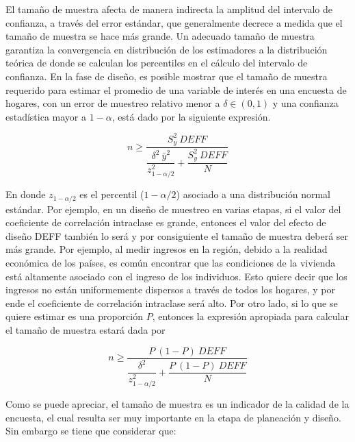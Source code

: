 \documentclass[
  12pt,
]{book}
\begin{document}
El tamaño de muestra afecta de manera indirecta la amplitud del intervalo de confianza, a través del error estándar, que generalmente decrece a medida que el tamaño de muestra se hace más grande. Un adecuado tamaño de muestra garantiza la convergencia en distribución de los estimadores a la distribución teórica de donde se calculan los percentiles en el cálculo del intervalo de confianza. En la fase de diseño, es posible mostrar que el tamaño de muestra requerido para estimar el promedio de una variable de interés en una encuesta de hogares, con un error de muestreo relativo menor a \(\delta \in (0,1)\) y una confianza estadística mayor a \(1-\alpha\), está dado por la siguiente expresión.

\[ 
n \geq \dfrac{S^2_{y}\ DEFF}{\dfrac{\delta^2 \  \bar{y}^2}{z_{1-\alpha/2}^2}+\dfrac{S^2_{y}\ DEFF}{N}}
\]

En donde \(z_{1-\alpha/2}\) es el percentil (\(1- \alpha/2\)) asociado a una distribución normal estándar. Por ejemplo, en un diseño de muestreo en varias etapas, si el valor del coeficiente de correlación intraclase es grande, entonces el valor del efecto de diseño DEFF también lo será y por consiguiente el tamaño de muestra deberá ser más grande. Por ejemplo, al medir ingresos en la región, debido a la realidad económica de los países, es común encontrar que las condiciones de la vivienda está altamente asociado con el ingreso de los individuos. Esto quiere decir que los ingresos no están uniformemente dispersos a través de todos los hogares, y por ende el coeficiente de correlación intraclase será alto. Por otro lado, si lo que se quiere estimar es una proporción \(P\), entonces la expresión apropiada para calcular el tamaño de muestra estará dada por

\[ 
n \geq \dfrac{P\ (1-P)\ DEFF}{\dfrac{\delta^2}{z_{1-\alpha/2}^2 }+\dfrac{P\ (1-P) \ DEFF}{N}}
\]

Como se puede apreciar, el tamaño de muestra es un indicador de la calidad de la encuesta, el cual resulta ser muy importante en la etapa de planeación y diseño. Sin embargo se tiene que considerar que:
\end{document}
